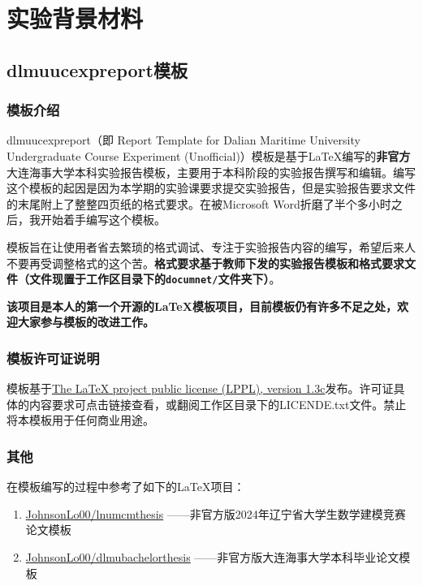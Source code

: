 \chapter{实验背景材料}

\section{dlmuucexpreport模板}

\subsection{模板介绍}

dlmuucexpreport（即 Report Template for Dalian Maritime University Undergraduate Course Experiment (Unofficial)）模板是基于\LaTeX 编写的\textbf{非官方}大连海事大学本科实验报告模板，主要用于本科阶段的实验报告撰写和编辑。编写这个模板的起因是因为本学期的实验课要求提交实验报告，但是实验报告要求文件的末尾附上了整整四页纸的格式要求。在被Microsoft Word折磨了半个多小时之后，我开始着手编写这个模板。

模板旨在让使用者省去繁琐的格式调试、专注于实验报告内容的编写，希望后来人不要再受调整格式的这个苦。\textbf{格式要求基于教师下发的实验报告模板和格式要求文件（文件现置于工作区目录下的\texttt{documnet/}文件夹下）}。

\textbf{该项目是本人的第一个开源的\LaTeX 模板项目，目前模板仍有许多不足之处，欢迎大家参与模板的改进工作。}

\subsection{模板许可证说明}

模板基于\href{https://www.latex-project.org/lppl/lppl-1-3c/}{The LaTeX project public license (LPPL), version 1.3c}发布。许可证具体的内容要求可点击链接查看，或翻阅工作区目录下的LICENDE.txt文件。禁止将本模板用于任何商业用途。

\subsection{其他}

在模板编写的过程中参考了如下的\LaTeX 项目：

\begin{enumerate}
  \item \href{https://github.com/JohnsonLo00/lnumcmthesis}{JohnsonLo00/lnumcmthesis} ——非官方版2024年辽宁省大学生数学建模竞赛论文模板
  \item \href{https://github.com/JohnsonLo00/dlmubachelorthesis}{JohnsonLo00/dlmubachelorthesis} ——非官方版大连海事大学本科毕业论文模板
\end{enumerate}

